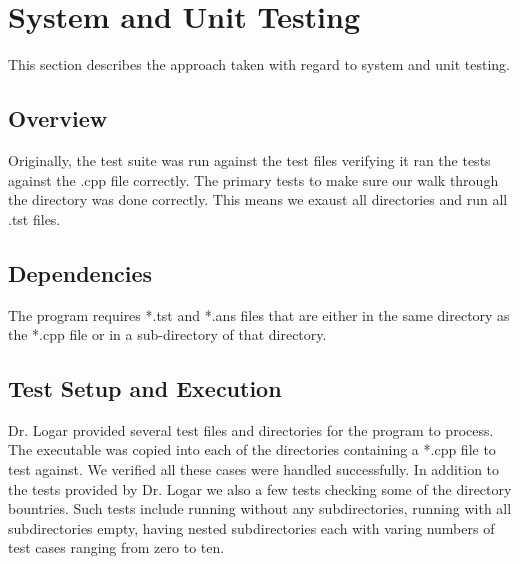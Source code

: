 
\chapter{System  and Unit Testing}

This section describes the approach taken with regard to system and unit testing. 

\section{Overview}
Originally, the test suite was run against the test files verifying it ran the tests against the .cpp file correctly. The primary tests to make sure our walk through the directory was done correctly. This means we exaust all directories and run all .tst files.



\section{Dependencies}
The program requires *.tst and *.ans files that are either in the same directory as the *.cpp file or in a sub-directory of that directory.

\section{Test Setup and Execution}
Dr. Logar provided several test files and directories for the program to process. The executable was copied into each of the directories containing a *.cpp file to test against. We verified all these cases were handled successfully. 
In addition to the tests provided by Dr. Logar we also a few tests checking some of the directory bountries. Such tests include running without any subdirectories, running with all subdirectories empty, having nested subdirectories each with varing numbers of test cases ranging from zero to ten.

